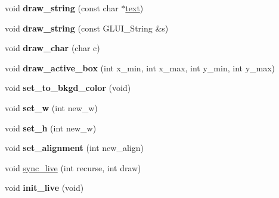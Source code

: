 \begin{DoxyCompactItemize}
\item 
\hypertarget{class_g_l_u_i___control_a05172f3645ac042839036c97e04ea819}{void {\bfseries draw\+\_\+string} (const char $\ast$\hyperlink{class_g_l_u_i___control_af0d60e9736f4dbc34e9a536e75876d72}{text})}\label{class_g_l_u_i___control_a05172f3645ac042839036c97e04ea819}

\item 
\hypertarget{class_g_l_u_i___control_aba5d462fcca0297c3dbf6a26d0774e4a}{void {\bfseries draw\+\_\+string} (const G\+L\+U\+I\+\_\+\+String \&s)}\label{class_g_l_u_i___control_aba5d462fcca0297c3dbf6a26d0774e4a}

\item 
\hypertarget{class_g_l_u_i___control_af8bfdf4867b4521fd3c12825e8a150db}{void {\bfseries draw\+\_\+char} (char c)}\label{class_g_l_u_i___control_af8bfdf4867b4521fd3c12825e8a150db}

\item 
\hypertarget{class_g_l_u_i___control_aa61812303961384f999c35f128f04c93}{void {\bfseries draw\+\_\+active\+\_\+box} (int x\+\_\+min, int x\+\_\+max, int y\+\_\+min, int y\+\_\+max)}\label{class_g_l_u_i___control_aa61812303961384f999c35f128f04c93}

\item 
\hypertarget{class_g_l_u_i___control_a091c0c095827c3270b442d9bd3542d50}{void {\bfseries set\+\_\+to\+\_\+bkgd\+\_\+color} (void)}\label{class_g_l_u_i___control_a091c0c095827c3270b442d9bd3542d50}

\item 
\hypertarget{class_g_l_u_i___control_a7f9dde76de0e5fd660dc43695b40c91d}{void {\bfseries set\+\_\+w} (int new\+\_\+w)}\label{class_g_l_u_i___control_a7f9dde76de0e5fd660dc43695b40c91d}

\item 
\hypertarget{class_g_l_u_i___control_acc29b79df3861b1910b2a41e0e8d2822}{void {\bfseries set\+\_\+h} (int new\+\_\+w)}\label{class_g_l_u_i___control_acc29b79df3861b1910b2a41e0e8d2822}

\item 
\hypertarget{class_g_l_u_i___control_ad853d2029a306239daa3c9af6c36730d}{void {\bfseries set\+\_\+alignment} (int new\+\_\+align)}\label{class_g_l_u_i___control_ad853d2029a306239daa3c9af6c36730d}

\item 
void \hyperlink{class_g_l_u_i___control_a56a06a9b1272eb0a537ea01a6c002cf8}{sync\+\_\+live} (int recurse, int draw)
\item 
\hypertarget{class_g_l_u_i___control_a4d56b92f8b6454c3f64ba6f0ef5470b8}{void {\bfseries init\+\_\+live} (void)}\label{class_g_l_u_i___control_a4d56b92f8b6454c3f64ba6f0ef5470b8}


\end{DoxyCompactItemize}

